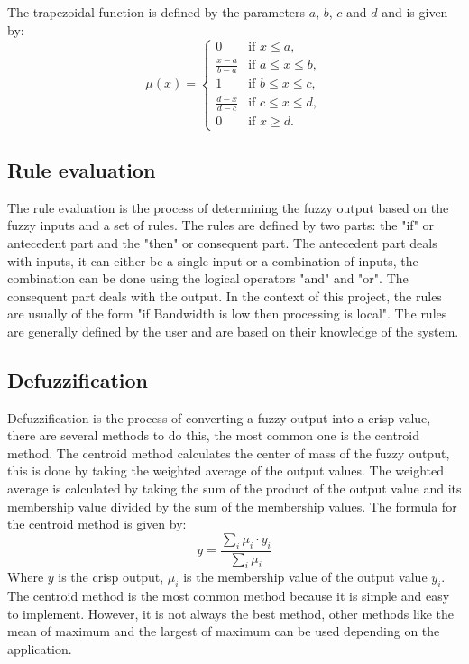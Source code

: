 The trapezoidal function is defined by the parameters $a$, $b$, $c$ and $d$ and is given by:
\begin{equation}
	\mu(x) = \begin{cases}
		0                   & \text{if } x \leq a,        \\
		\frac{x - a}{b - a} & \text{if } a \leq x \leq b, \\
		1                   & \text{if } b \leq x \leq c, \\
		\frac{d - x}{d - c} & \text{if } c \leq x \leq d, \\
		0                   & \text{if } x \geq d.
	\end{cases}
\end{equation}

\subsection{Rule evaluation}

The rule evaluation is the process of determining the fuzzy output based on the fuzzy inputs and a set of rules. The rules are defined by two parts:
the "if" or antecedent part and the "then" or consequent part. The antecedent part deals with inputs, it can either be a single input or a combination
of inputs, the combination can be done using the logical operators "and" and "or". The consequent part deals with the output. In the context of this
project, the rules are usually of the form "if Bandwidth is low then processing is local". The rules are generally defined by the user and are based
on their knowledge of the system.

\subsection{Defuzzification}

Defuzzification is the process of converting a fuzzy output into a crisp value, there are several methods to do this, the most common one is the
centroid method. The centroid method calculates the center of mass of the fuzzy output, this is done by taking the weighted average of the output
values. The weighted average is calculated by taking the sum of the product of the output value and its membership value divided by the sum of the
membership values. The formula for the centroid method is given by:
\begin{equation}
	y = \frac{\sum_{i} \mu_i \cdot y_i}{\sum_{i} \mu_i}
\end{equation}
Where $y$ is the crisp output, $\mu_i$ is the membership value of the output value $y_i$. The centroid method is the most common method because it
is simple and easy to implement. However, it is not always the best method, other methods like the mean of maximum and the largest of maximum can
be used depending on the application.

